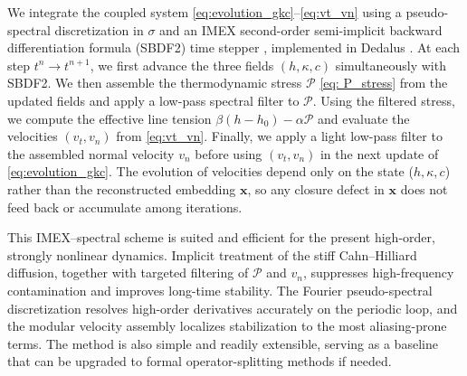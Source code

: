 \documentclass[
aip,
jcp,
reprint, 
floatfix
]{revtex4-1}
\begin{document}
We integrate the coupled system \eqref{eq:evolution_gkc}--\eqref{eq:vt_vn} using a pseudo-spectral discretization in $\sigma$ and an IMEX second-order semi-implicit backward differentiation formula (SBDF2) time stepper \cite{ascher1995implicit, wang2008variable}, implemented in Dedalus \cite{burns2020dedalus}. At each step $t^n\to t^{n+1}$, we first advance the three fields $(h,\kappa,c)$ simultaneously with SBDF2. We then assemble the thermodynamic stress $\mathcal P$ \eqref{eq: P_stress} from the updated fields and apply a low-pass spectral filter to $\mathcal P$. Using the filtered stress, we compute the effective line tension $\beta(h-h_0)-\alpha\mathcal P$ and evaluate the velocities $(v_t,v_n)$ from \eqref{eq:vt_vn}. Finally, we apply a light low-pass filter to the assembled normal velocity $v_n$ before using $(v_t,v_n)$ in the next update of \eqref{eq:evolution_gkc}.  The evolution of velocities depend only on the state ($h, \kappa, c$) rather than the reconstructed embedding $\mathbf{x}$, so any closure defect in $\mathbf{x}$ does not feed back or accumulate among iterations.

This IMEX--spectral scheme is suited and efficient for the present high-order, strongly nonlinear dynamics. Implicit treatment of the stiff Cahn--Hilliard diffusion, together with targeted filtering of $\mathcal P$ and $v_n$, suppresses high-frequency contamination and improves long-time stability. The Fourier pseudo-spectral discretization resolves high-order derivatives accurately on the periodic loop, and the modular velocity assembly localizes stabilization to the most aliasing-prone terms. The method is also simple and readily extensible, serving as a baseline that can be upgraded to formal operator-splitting methods \cite{blanes2024splitting} if needed.
\end{document}

